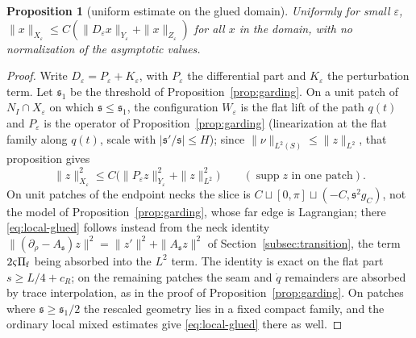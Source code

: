 \documentclass[11pt]{amsart}
\newtheorem{proposition}[theorem]{Proposition}
\theoremstyle{definition}
\theoremstyle{remark}
\theoremstyle{plain}
\numberwithin{equation}{section}
\newcommand{\eps}{\varepsilon}
\begin{document}
\begin{proposition}[uniform estimate on the glued domain]\label{prop:attached-garding}
Uniformly for small $\eps$,
$\|x\|_{X_\eps}\le C(\|D_\eps x\|_{Y_\eps}+\|x\|_{Z_\eps})$ for all $x$ in the
domain, with no normalization of the asymptotic values.
\end{proposition}

\begin{proof}
Write $D_\eps=P_\eps+K_\eps$, with $P_\eps$ the differential part and $K_\eps$ the
perturbation term. Let ${\mathfrak s}_1$ be the threshold of Proposition~\ref{prop:garding}. On a unit
patch of $N_I\cap X_\eps$ on which ${\mathfrak s}\le{\mathfrak s}_1$, the configuration $W_\eps$ is the flat lift of
the path $q(t)$ and $P_\eps$ is the operator of Proposition~\ref{prop:garding} (linearization at
the flat family along $q(t)$, scale with $|{\mathfrak s}'/{\mathfrak s}|\le H$); since $\|\nu\|_{L^2(S)}\le\|z\|_{L^2}$,
that proposition gives
\begin{equation}\label{eq:local-glued}
\|z\|_{X_\eps}^2\le C\bigl(\|P_\eps z\|_{Y_\eps}^2+\|z\|_{L^2}^2\bigr)
\qquad(\operatorname{supp}z\text{ in one patch}).
\end{equation}
On unit patches of the endpoint necks the slice is
$C\sqcup[0,\pi]\sqcup(-C,{\mathfrak s}^2g_C)$, not the model of
Proposition~\ref{prop:garding}, whose far edge is Lagrangian; there
\eqref{eq:local-glued} follows instead from the neck identity
$\|(\partial_\rho-A_{\mathfrak s})z\|^2=\|z'\|^2+\|A_{\mathfrak s}z\|^2$ of
Section~\ref{subsec:transition}, the term $2\varsigma\Pi_{\rm f}$ being absorbed into the $L^2$ term. The
identity is exact on the flat part $s\ge L/4+c_R$; on the remaining patches the seam and
$\dot q$ remainders are absorbed by trace interpolation, as in the proof of
Proposition~\ref{prop:garding}.
On patches where ${\mathfrak s}\ge{\mathfrak s}_1/2$ the rescaled geometry lies in a fixed compact family, and
the ordinary local mixed estimates give \eqref{eq:local-glued} there as well.


\end{proof}
\end{document}
